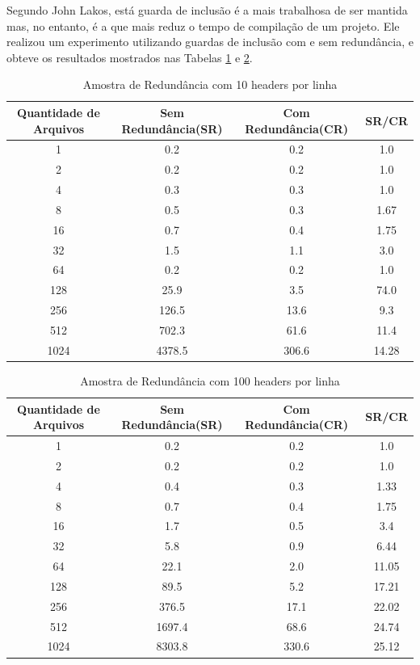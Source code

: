 \begin{enumerate}
Segundo John Lakos, está guarda de inclusão é a mais trabalhosa de ser mantida
 mas, no entanto, é a que mais reduz o tempo de compilação de um projeto. Ele
 realizou um experimento utilizando guardas de inclusão com e sem redundância,
 e obteve os resultados mostrados nas Tabelas \ref{tab:tabela_01} e 
\ref{tab:tabela_02}.

\begin{table}[!ht]
    \centering
    \caption {Amostra de Redundância com 10 headers por linha}
    \label{tab:tabela_01}
    \begin{tiny}
    \begin{tabular}{cccc}
    \toprule
    \textbf{Quantidade de Arquivos} & \textbf{Sem Redundância(SR)} & \textbf{Com Redundância(CR)} &  \textbf{SR/CR} \\
    \midrule
    1 & 0.2 & 0.2 & 1.0\\
    2 & 0.2 & 0.2 & 1.0\\
    4 & 0.3 & 0.3 & 1.0\\
    8 & 0.5 & 0.3 & 1.67\\
    16 & 0.7 & 0.4 & 1.75\\
    32 & 1.5 & 1.1 & 3.0\\
    64 & 0.2 & 0.2 & 1.0\\
    128 & 25.9 & 3.5 & 74.0\\
    256 & 126.5 & 13.6 & 9.3\\
    512 & 702.3 & 61.6 & 11.4\\
    1024 & 4378.5 & 306.6 & 14.28\\
    \bottomrule
    \end{tabular}
    \end{tiny}
\end{table}

\begin{table}[!ht]
    \centering
    \caption {Amostra de Redundância com 100 headers por linha }
    \label{tab:tabela_02}
    \begin{tiny}
    \begin{tabular}{cccc}
    \toprule
    \textbf{Quantidade de Arquivos} & \textbf{Sem Redundância(SR)} & \textbf{Com Redundância(CR)} &  \textbf{SR/CR} \\
    \midrule
    1 & 0.2 & 0.2 & 1.0\\
    2 & 0.2 & 0.2 & 1.0\\
    4 & 0.4 & 0.3 & 1.33\\
    8 & 0.7 & 0.4 & 1.75\\
    16 & 1.7 & 0.5 & 3.4\\
    32 & 5.8 & 0.9 & 6.44\\
    64 & 22.1 & 2.0 & 11.05\\
    128 & 89.5 & 5.2 & 17.21\\
    256 & 376.5 & 17.1 & 22.02\\
    512 & 1697.4 & 68.6 & 24.74\\
    1024 & 8303.8 & 330.6 & 25.12\\
    \bottomrule
    \end{tabular}
    \end{tiny}
\end{table}


\end{enumerate}
